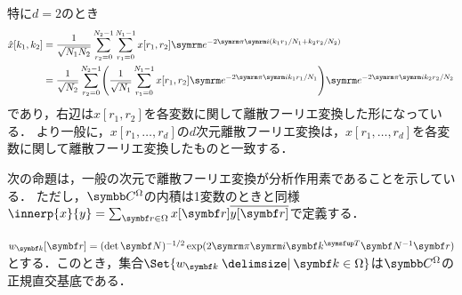\documentclass[../../main]{subfiles}
\begin{document}

特に\(d=2\)のとき
\begin{align*}
  \hat{x}[k_1,k_2] &= \frac{1}{\sqrt{N_1N_2}}\sum_{r_2=0}^{N_2-1}\sum_{r_1=0}^{N_1-1}x[r_1,r_2]\napr^{-2\krez\iuni(k_1r_1/N_1+k_2r_2/N_2)} \\
  &= \frac{1}{\sqrt{N_2}}\sum_{r_2=0}^{N_2-1}\pqty*{\frac{1}{\sqrt{N_1}}\sum_{r_1=0}^{N_1-1}x[r_1,r_2]\napr^{-2\krez\iuni k_1r_1/N_1}}\napr^{-2\krez\iuni k_2r_2/N_2}
\end{align*}
であり，右辺は\(x[r_1,r_2]\)を各変数に関して離散フーリエ変換した形になっている．
より一般に，\(x[r_1,\dots,r_d]\)の\(d\)次元離散フーリエ変換は，\(x[r_1,\dots,r_d]\)を各変数に関して離散フーリエ変換したものと一致する．

次の命題は，一般の次元で離散フーリエ変換が分析作用素であることを示している．
ただし，\(\numset{C}^\Omega\)の内積は1変数のときと同様\(\innerp{x}{y}=\sum_{\vect{r}\in\Omega}x[\vect{r}]\conj*{y[\vect{r}]}\)で定義する．

\begin{proposition}{}{}
  \(w_{\vect{k}}[\vect{r}]=(\det\mat{N})^{-1/2}\exp(2\krez\iuni\trps{\vect{k}}\mat{N}^{-1}\vect{r})\)とする．このとき，集合\(\Set{w_{\vect{k}}\given\vect{k}\in\Omega}\)は\(\numset{C}^\Omega\)の正規直交基底である．
\end{proposition}
\end{document}
